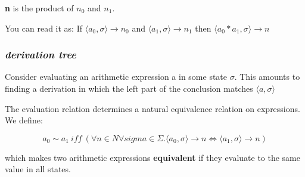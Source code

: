 \documentclass[a4paper, 12pt]{article}
\begin{document}
    \textbf{n} is  the product of $n_0$ and $n_1$.

%
You can read it as:
%
If $\langle a_0, \sigma \rangle \rightarrow n_0$ and $\langle a_1, \sigma \rangle \rightarrow n_1$ then $\langle a_0 * a_1, \sigma \rangle \rightarrow n$


\subsubsection*{\textit{derivation tree}}
    Consider evaluating an arithmetic expression a in some state $\sigma$. This amounts to finding a derivation in which the left part of the conclusion matches $\langle a, \sigma \rangle$

    The evaluation relation determines a natural equivalence relation on expressions.
    We define:


        \[
            a_0 \sim a_1\ {iff}\ (\forall n \in N \forall sigma \in \Sigma. \langle a_0, \sigma \rangle \rightarrow n \iff \langle a_1, \sigma \rangle \rightarrow n)
        \]


    which makes two arithmetic expressions \textbf{equivalent} if they evaluate to the same value in all states.
\end{document}
